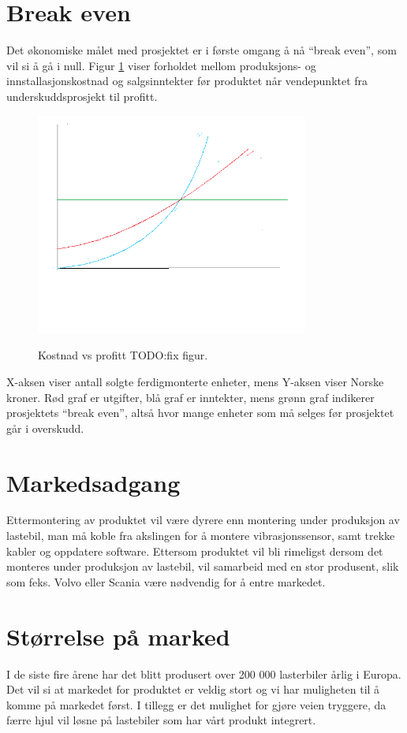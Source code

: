 \begin{table}[H]
\section{Break even}
Det økonomiske målet med prosjektet er i første omgang å nå ``break even'', 
som vil si å gå i null. Figur \ref{fig:breakeven} viser forholdet mellom 
produksjons- og innstallasjonskostnad og salgsinntekter før produktet når 
vendepunktet fra underskuddsprosjekt til profitt. 
	\newline
	\begin{figure}[H]
		\centering
		\includegraphics[width=0.80\textwidth]{images/break-even.png}
		\label{fig:breakeven}
		\caption{Kostnad vs profitt TODO:fix figur.}
	\end{figure}
X-aksen viser antall solgte ferdigmonterte enheter, mens Y-aksen viser 
Norske kroner. Rød graf er utgifter, blå graf er inntekter, mens grønn graf 
indikerer prosjektets ``break even'', altså hvor mange enheter som må selges 
før prosjektet går i overskudd.

\section{Markedsadgang}
Ettermontering av produktet vil være dyrere enn montering under produksjon av 
lastebil, man må koble fra akslingen for å montere vibrasjonssensor, samt 
trekke kabler og oppdatere software. Ettersom produktet vil bli rimeligst 
dersom det monteres under produksjon av lastebil, vil  samarbeid med en stor 
produsent, slik som feks. Volvo eller Scania være nødvendig for å entre markedet. 

\section{Størrelse på marked}
I de siste fire årene har det blitt produsert over 200 000 lasterbiler årlig 
i Europa\cite{lastebilprod-DAF}. Det vil si at markedet for produktet er 
veldig stort og vi har muligheten til å komme på markedet først. I tillegg er 
det mulighet for gjøre veien tryggere, da færre hjul vil løsne på lastebiler 
som har vårt produkt integrert.


\end{table}
